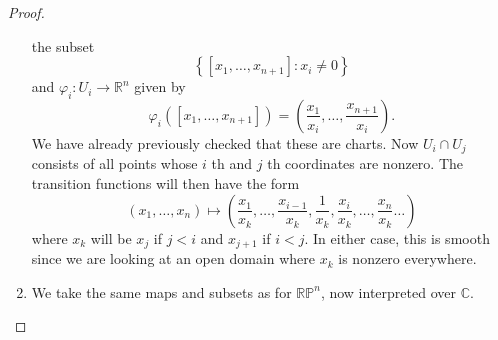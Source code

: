 \documentclass[reqno]{amsart}
\theoremstyle{definition}
\theoremstyle{remark}
\begin{document}
\begin{proof}
\begin{enumerate}
                the subset
                 \[
                \left\{ \left[ x_1, \ldots,
                x_{n+1} \right] \colon x_i \neq 0 \right\} 
                \] 
                and
                $\varphi_i \colon
                U_i \to \mathbb{R}^{n}$ given by
                \[
                \varphi_i 
                \left( \left[ x_1, \ldots, x_{n+1} \right]  \right) 
                = \left( \frac{x_1}{x_i}, \ldots,
                \frac{x_{n+1}}{x_i}\right).
                \] 
                We have already previously checked that
                these are charts. Now 
                $U_i \cap U_j$ consists of all
                points whose $i$ th and $j$ th coordinates
                are nonzero. The transition functions will then
                have the form
                \[
                    \left( x_1, \ldots, x_n \right) 
                    \mapsto 
                    \left( \frac{x_1}{x_k}, \ldots
                    , 
                \frac{x_{i-1}}{x_k}, \frac{1}{x_k},
            \frac{x_i}{x_k}, \ldots , 
        \frac{x_n}{x_k}\ldots\right) 
                \] 
                where
                $x_k$ will be $x_j$ if 
                $j<i$ and
                $x_{j+1}$ if $i<j$. In either case,
                this is smooth since
                we are looking at an open domain
                where $x_k$ is nonzero everywhere.
            \item 
                We take the same maps
                and subsets as for $\mathbb{R}\mathbb{P}^{n}$,
                now interpreted over $\mathbb{C}$.


\end{enumerate}
\end{proof}
\end{document}
